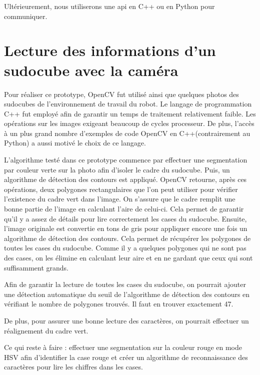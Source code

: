 Ultérieurement, nous utiliserons une api en C++ ou en Python pour communiquer.

\section{Lecture des informations d'un sudocube avec la caméra}
Pour réaliser ce prototype, OpenCV fut utilisé ainsi que quelques photos des sudocubes de l’environnement de travail du robot. Le langage de programmation C++ fut employé afin de garantir un temps de traitement relativement faible. Les opérations sur les images exigeant beaucoup de cycles processeur. De plus, l'accès à un plus grand nombre d'exemples de code OpenCV en C++(contrairement au Python) a aussi motivé le choix de ce langage.

L'algorithme testé dans ce prototype commence par effectuer une segmentation par couleur verte sur la photo afin d'isoler le cadre du sudocube. Puis, un algorithme de détection des contours est appliqué. OpenCV retourne, après ces opérations, deux polygones rectangulaires que l'on peut utiliser pour vérifier l'existence du cadre vert dans l'image. On s'assure que le cadre remplit une bonne partie de l'image en calculant l'aire de celui-ci. Cela permet de garantir qu'il y a assez de détails pour lire correctement les cases du sudocube. Ensuite, l'image originale est convertie en tons de gris pour appliquer encore une fois un algorithme de détection des contours. Cela permet de récupérer les polygones de toutes les cases du sudocube. Comme il y a quelques polygones qui ne sont pas des cases, on les élimine en calculant leur aire et en ne gardant que ceux qui sont suffisamment grands.

Afin de garantir la lecture de toutes les cases du sudocube, on pourrait ajouter une détection automatique du seuil de l'algorithme de détection des contours en vérifiant le nombre de polygones trouvés. Il faut en trouver exactement 47.

De plus, pour assurer une bonne lecture des caractères, on pourrait effectuer un réalignement du cadre vert.

Ce qui reste à faire : effectuer une segmentation sur la couleur rouge en mode HSV afin d'identifier la case rouge et créer un algorithme de reconnaissance des caractères pour lire les chiffres dans les cases.

